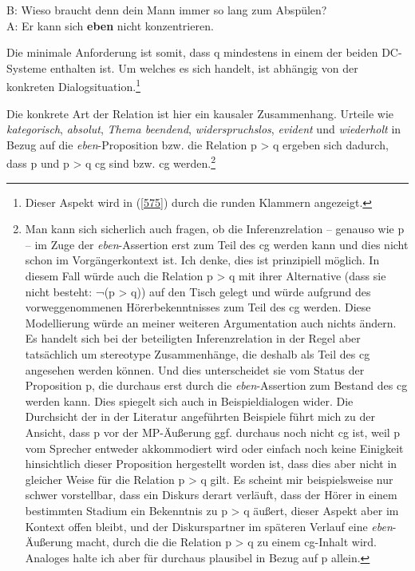 \begin{exe}
	\ex\label{579} 						
	B: Wieso braucht denn dein Mann immer so lang zum Abspülen?\\
	A: Er kann sich \textbf{eben} nicht konzentrieren.	
 	\hfill\hbox{\citet[322]{Troemel-Ploetz1979}}	
 \end{exe}
Die minimale Anforderung ist somit, dass q mindestens in einem der beiden DC-Systeme enthalten ist. Um welches es sich handelt, ist abhängig von der konkreten Dialogsituation.\footnote{Dieser Aspekt wird in (\ref{575}) durch die runden Klammern angezeigt.}\largerpage[1.5]

Die konkrete Art der Relation ist hier ein kausaler Zusammenhang. Urteile wie \textit{kategorisch}, \textit{absolut}, \textit{Thema beendend}, \textit{widerspruchslos}, \textit{evident} und \textit{wiederholt} in Bezug auf die \textit{eben}-Proposition bzw. die Relation p > q ergeben sich dadurch, dass p und p > q cg sind bzw. cg werden.\footnote{ Man kann sich sicherlich auch fragen, ob die Inferenzrelation – genauso wie p – im Zuge der \textit{eben}-Assertion erst zum Teil des cg werden kann und dies nicht schon im Vorgängerkontext ist. Ich denke, dies ist prinzipiell möglich. In diesem Fall würde auch die Relation p > q mit ihrer Alternative (dass sie nicht besteht: ¬(p > q)) auf den Tisch gelegt und würde aufgrund des vorweggenommenen Hörerbekenntnisses zum Teil des cg werden. Diese Modellierung würde an meiner weiteren Argumentation auch nichts ändern. Es handelt sich bei der beteiligten Inferenzrelation in der Regel aber tatsächlich um stereotype Zusammenhänge, die deshalb als Teil des cg angesehen werden können. Und dies unterscheidet sie vom Status der Proposition p, die durchaus erst durch die \textit{eben}-Assertion zum Bestand des cg werden kann. Dies spiegelt sich auch in Beispieldialogen wider. Die Durchsicht der in der Literatur angeführten Beispiele führt mich zu der Ansicht, dass p vor der MP-Äußerung ggf. durchaus noch nicht cg ist, weil p vom Sprecher entweder akkommodiert wird oder einfach noch keine Einigkeit hinsichtlich dieser Proposition hergestellt worden ist, dass dies aber nicht in gleicher Weise für die Relation p > q gilt. Es scheint mir beispielsweise nur schwer vorstellbar, dass ein Diskurs derart verläuft, dass der Hörer in einem bestimmten Stadium ein Bekenntnis zu p > q äußert, dieser Aspekt aber im Kontext offen bleibt, und der Diskurspartner im späteren Verlauf eine \textit{eben}-Äußerung macht, durch die die Relation p > q zu einem cg-Inhalt wird. Analoges halte ich aber für durchaus plausibel in Bezug auf p allein.}

